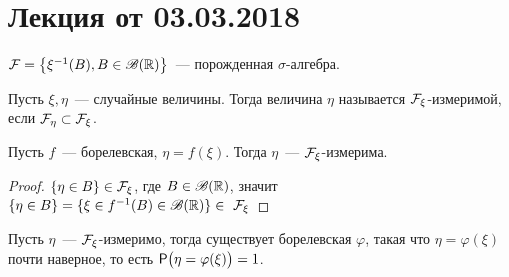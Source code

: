 \section{Лекция от 03.03.2018}
\setcounter{property}{0}
\begin{definition}
	$\F = \big\{ \xi^{-1}(B), B \in \B(\R) \big\}$~--- порожденная $\sigma$-алгебра.
\end{definition}
\begin{definition}
	Пусть $\xi, \eta$~--- случайные величины. Тогда величина $\eta$ называется $\F_\xi$-измеримой, если $\F_\eta \subset \F_\xi$.
\end{definition}
\begin{example}
	Пусть $f$~--- борелевская, $\eta = f(\xi)$. Тогда $\eta$~--- $\F_\xi$-измерима.
	\begin{proof}
		$\{\eta \in B\} \in \F_\xi$, где $B \in \B(\R)$, значит $\{\eta \in B\} = \{\xi \in f^{-1}(B) \in \B(\R)\} \in~\F_\xi$
	\end{proof}
\end{example}
\begin{theorem}[][Пока б/д]
	Пусть  $\eta$~--- $\F_\xi$-измеримо, тогда существует борелевская $\varphi$, такая что $\eta = \varphi(\xi)$ почти наверное, то есть $\P\big(\eta = \varphi(\xi)\big) = 1$.
\end{theorem}
